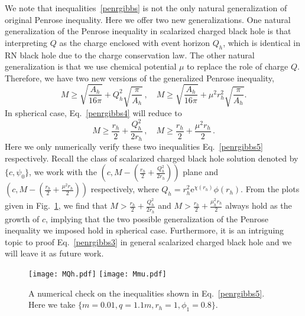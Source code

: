 \documentclass[pr, twocolumn, preprintnumbers, showpacs,footnoteadded, superscriptaddress,nofootinbib,longbibliography]{revtex4-1}
\newcommand{\te}{\mathrm{e}}
\begin{document}
We note that inequalities~\eqref{penrgibbs} is not the only natural generalization of original Penrose inequality. Here we offer two new generalizations. One natural generalization of the Penrose inequality in scalarized charged black hole is that interpreting $Q$ as the charge enclosed with event horizon $Q_h$, which is identical in RN black hole due to the charge conservation law. The other natural generalization is that we use chemical potential $\mu$ to replace the role of charge $Q$. Therefore, we have two new versions of the generalized Penrose inequality,
%
\begin{equation}\label{penrgibbs4}
  M\geq\sqrt{\frac{A_h}{16\pi}}+Q_h^2\sqrt{\frac{\pi}{A_h}}\, , \quad M\geq\sqrt{\frac{A_h}{16\pi}}+\mu^2 r_h^2 \sqrt{\frac{\pi}{A_h}}.
\end{equation}
%
In spherical case, Eq.~\eqref{penrgibbs4} will reduce to
%
\begin{equation}\label{penrgibbs5}
  M\geq\frac{r_h}2+\frac{Q_h^2}{2r_h}\,, \quad  M\geq\frac{r_h}2+\frac{\mu^2 r_h}{2}\, .
\end{equation}
%
Here we only numerically verify these two inequalities Eq.~\eqref{penrgibbs5} respectively. Recall the class of scalarized charged black hole solution denoted by $\{c, \psi_0 \}$, we work with the $\left(c, M-\left(\frac{r_h}{2}+\frac{Q_h^2}{2r_h}\right)\right)$ plane and $\left(c, M-\left(\frac{r_h}{2}+\frac{\mu^2 r_h}{2 }\right)\right)$ respectively, where $Q_h= r_h^2 \te^{\chi(r_h)}\phi(r_h)$. From the plots given in Fig.~\ref{fig6}, we find that $M>\frac{r_h}{2}+\frac{Q_h^2}{2 r_h}$ and $M>\frac{r_h}{2}+\frac{\mu_h^2 r_h}{2}$ always hold as the growth of $c$, implying that the two possible generalization of the Penrose inequality we imposed hold in spherical case. Furthermore, it is an intriguing topic to proof Eq.~\eqref{penrgibbs3} in general scalarized charged black hole and we will leave it as future work.
%
\begin{figure}[htpb]
  \centering
  \texttt{[image: MQh.pdf]}
  \texttt{[image: Mmu.pdf]}
 \caption{A numerical check on the inequalities shown in Eq.~\eqref{penrgibbs5}. Here we take $\{m=0.01, q=1.1m, r_h=1, \phi_1=0.8\}$.}\label{fig6}
\end{figure}
%
\end{document}
